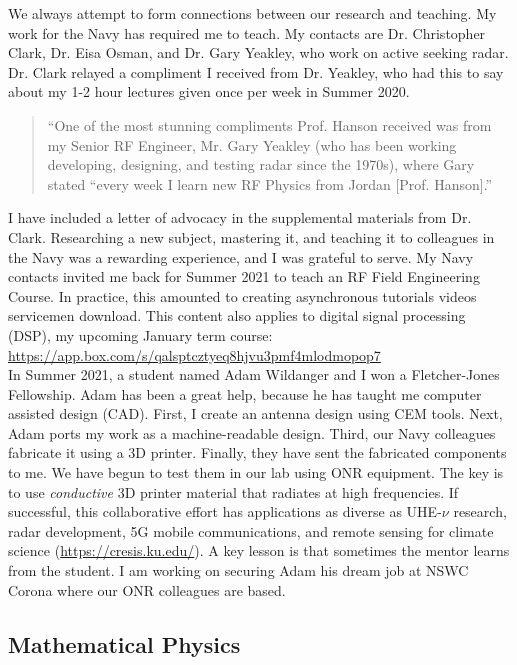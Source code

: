 \documentclass[../../../main.tex]{subfiles}
\begin{document}
We always attempt to form connections between our research and teaching.  My work for the Navy has required me to teach.  My contacts are Dr. Christopher Clark, Dr. Eisa Osman, and Dr. Gary Yeakley, who work on active seeking radar.  Dr. Clark relayed a compliment I received from Dr. Yeakley, who had this to say about my 1-2 hour lectures given once per week in Summer 2020.
\begin{quote}
``One of the most stunning compliments Prof. Hanson received was from my Senior RF Engineer, Mr. Gary Yeakley (who has been working developing, designing, and testing radar since the 1970s), where Gary stated ``every week I learn new RF Physics from Jordan [Prof. Hanson].''
\end{quote}
I have included a letter of advocacy in the supplemental materials from Dr. Clark.  Researching a new subject, mastering it, and teaching it to colleagues in the Navy was a rewarding experience, and I was grateful to serve.  My Navy contacts invited me back for Summer 2021 to teach an RF Field Engineering Course.  In practice, this amounted to creating asynchronous tutorials videos servicemen download.  This content also applies to digital signal processing (DSP), my upcoming January term course: \\ \vspace{0.15cm}\url{https://app.box.com/s/qalsptcztyeq8hjvu3pmf4mlodmopop7}
\\
\vspace{0.15cm}
In Summer 2021, a student named Adam Wildanger and I won a Fletcher-Jones Fellowship.  Adam has been a great help, because he has taught me computer assisted design (CAD).  First, I create an antenna design using CEM tools.  Next, Adam ports my work as a machine-readable design.  Third, our Navy colleagues fabricate it using a 3D printer.  Finally, they have sent the fabricated components to me.  We have begun to test them in our lab using ONR equipment.  The key is to use \textit{conductive} 3D printer material that radiates at high frequencies.  If successful, this collaborative effort has applications as diverse as UHE-$\nu$ research, radar development, 5G mobile communications, and remote sensing for climate science (\url{https://cresis.ku.edu/}).  A key lesson is that sometimes the mentor learns from the student.  I am working on securing Adam his dream job at NSWC Corona where our ONR colleagues are based.

\subsection{Mathematical Physics}
\label{sec:math_phys}
\end{document}
